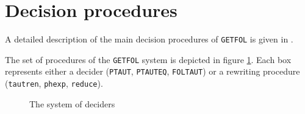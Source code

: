 \newcommand{\eg}{{\em e.g.~}}
\newcommand{\ie}{{\em i.e.~}}
\newcommand{\wrt}{w.r.t.~}
\newcommand{\co}[2]{\langle #1, \: #2 \rangle}


\section{Decision procedures}
\label{sec-decide}
\label{system:sec}
A detailed description of the main decision procedures of {\tt GETFOL}
is given in \cite{armando5}.

The set of procedures of the {\tt GETFOL} system is depicted in figure
\ref{system:fig}.
Each box represents either a decider ({\tt PTAUT}, {\tt PTAUTEQ},
{\tt FOLTAUT}) or a rewriting procedure ({\tt tautren}, {\tt  phexp},
{\tt  reduce}).

\begin{figure}
\begin{center}
\end{center}
\caption{The system of deciders}
\label{system:fig}
\end{figure}

